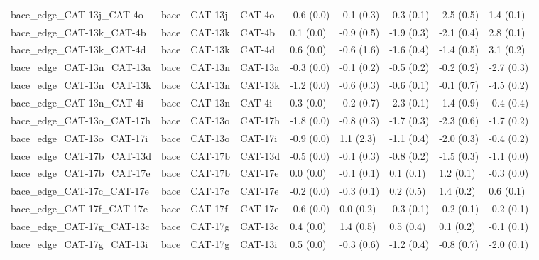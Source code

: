 \begin{tabular}{lllllllll}
bace\_edge\_CAT-13j\_CAT-4o         &      bace &     CAT-13j &      CAT-4o &  -0.6 (0.0) &        -0.1 (0.3) &  -0.3 (0.1) &  -2.5 (0.5) &   1.4 (0.1) \\
bace\_edge\_CAT-13k\_CAT-4b         &      bace &     CAT-13k &      CAT-4b &   0.1 (0.0) &        -0.9 (0.5) &  -1.9 (0.3) &  -2.1 (0.4) &   2.8 (0.1) \\
bace\_edge\_CAT-13k\_CAT-4d         &      bace &     CAT-13k &      CAT-4d &   0.6 (0.0) &        -0.6 (1.6) &  -1.6 (0.4) &  -1.4 (0.5) &   3.1 (0.2) \\
bace\_edge\_CAT-13n\_CAT-13a        &      bace &     CAT-13n &     CAT-13a &  -0.3 (0.0) &        -0.1 (0.2) &  -0.5 (0.2) &  -0.2 (0.2) &  -2.7 (0.3) \\
bace\_edge\_CAT-13n\_CAT-13k        &      bace &     CAT-13n &     CAT-13k &  -1.2 (0.0) &        -0.6 (0.3) &  -0.6 (0.1) &  -0.1 (0.7) &  -4.5 (0.2) \\
bace\_edge\_CAT-13n\_CAT-4i         &      bace &     CAT-13n &      CAT-4i &   0.3 (0.0) &        -0.2 (0.7) &  -2.3 (0.1) &  -1.4 (0.9) &  -0.4 (0.4) \\
bace\_edge\_CAT-13o\_CAT-17h        &      bace &     CAT-13o &     CAT-17h &  -1.8 (0.0) &        -0.8 (0.3) &  -1.7 (0.3) &  -2.3 (0.6) &  -1.7 (0.2) \\
bace\_edge\_CAT-13o\_CAT-17i        &      bace &     CAT-13o &     CAT-17i &  -0.9 (0.0) &         1.1 (2.3) &  -1.1 (0.4) &  -2.0 (0.3) &  -0.4 (0.2) \\
bace\_edge\_CAT-17b\_CAT-13d        &      bace &     CAT-17b &     CAT-13d &  -0.5 (0.0) &        -0.1 (0.3) &  -0.8 (0.2) &  -1.5 (0.3) &  -1.1 (0.0) \\
bace\_edge\_CAT-17b\_CAT-17e        &      bace &     CAT-17b &     CAT-17e &   0.0 (0.0) &        -0.1 (0.1) &   0.1 (0.1) &   1.2 (0.1) &  -0.3 (0.0) \\
bace\_edge\_CAT-17c\_CAT-17e        &      bace &     CAT-17c &     CAT-17e &  -0.2 (0.0) &        -0.3 (0.1) &   0.2 (0.5) &   1.4 (0.2) &   0.6 (0.1) \\
bace\_edge\_CAT-17f\_CAT-17e        &      bace &     CAT-17f &     CAT-17e &  -0.6 (0.0) &         0.0 (0.2) &  -0.3 (0.1) &  -0.2 (0.1) &  -0.2 (0.1) \\
bace\_edge\_CAT-17g\_CAT-13c        &      bace &     CAT-17g &     CAT-13c &   0.4 (0.0) &         1.4 (0.5) &   0.5 (0.4) &   0.1 (0.2) &  -0.1 (0.1) \\
bace\_edge\_CAT-17g\_CAT-13i        &      bace &     CAT-17g &     CAT-13i &   0.5 (0.0) &        -0.3 (0.6) &  -1.2 (0.4) &  -0.8 (0.7) &  -2.0 (0.1) \\

\end{tabular}
